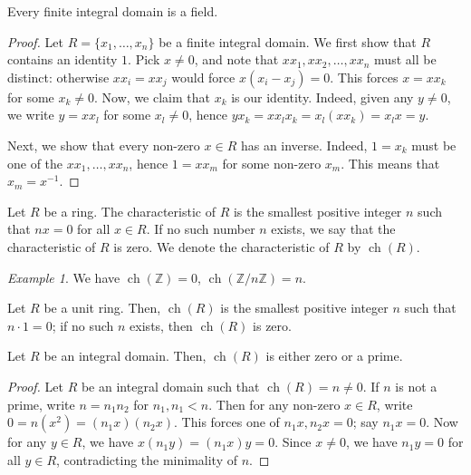 \documentclass[11pt]{article}
\newcommand{\Z}{\mathbb{Z}}
\DeclareMathOperator{\ch}{ch}
\theoremstyle{definition}
\theoremstyle{remark}
\newtheorem*{example}{Example}
\numberwithin{equation}{section}
\begin{document}
    \begin{theorem}
        Every finite integral domain is a field.
    \end{theorem}
    \begin{proof}
        Let $R = \{x_1, \dots, x_n\}$ be a finite integral domain. We first show that
        $R$ contains an identity $1$. Pick $x \neq 0$, and note that $x x_1, x x_2,
        \dots, x x_n$ must all be distinct: otherwise $x x_i = x x_j$ would force
        $x(x_i - x_j) = 0$. This forces $x = x x_k$ for some $x_k \neq 0$. Now, we
        claim that $x_k$ is our identity. Indeed, given any $y \neq 0$, we write $y =
        xx_l$ for some $x_l \neq 0$, hence $yx_k = x x_l x_k = x_l(x x_k) = x_lx =
        y$.

        Next, we show that every non-zero $x \in R$ has an inverse. Indeed, $1 = x_k$
        must be one of the $x x_1, \dots, x x_n$, hence $1 = x x_m$ for some non-zero
        $x_m$. This means that $x_m = x^{-1}$.
    \end{proof}

    \begin{definition}
        Let $R$ be a ring. The characteristic of $R$ is the smallest positive integer
        $n$ such that $nx = 0$ for all $x \in R$. If no such number $n$ exists, we
        say that the characteristic of $R$ is zero. We denote the characteristic of
        $R$ by $\ch(R)$.
    \end{definition}
    \begin{example}
        We have $\ch(\Z) = 0$, $\ch(\Z/n\Z) = n$.
    \end{example}

    \begin{lemma}
        Let $R$ be a unit ring. Then, $\ch(R)$ is the smallest positive integer $n$
        such that $n\cdot 1 = 0$; if no such $n$ exists, then $\ch(R)$ is zero.
    \end{lemma}

    \begin{theorem}
        Let $R$ be an integral domain. Then, $\ch(R)$ is either zero or a prime.
    \end{theorem}
    \begin{proof}
        Let $R$ be an integral domain such that $\ch(R) = n \neq 0$. If $n$ is not a
        prime, write $n = n_1n_2$ for $n_1, n_1 < n$. Then for any non-zero $x \in
        R$, write $0 = n(x^2) = (n_1x)(n_2x)$. This forces one of $n_1x, n_2x = 0$;
        say $n_1x = 0$. Now for any $y \in R$, we have $x(n_1 y) = (n_1 x)y = 0$.
        Since $x \neq 0$, we have $n_1y = 0$ for all $y \in R$, contradicting the
        minimality of $n$.
    \end{proof}
\end{document}
